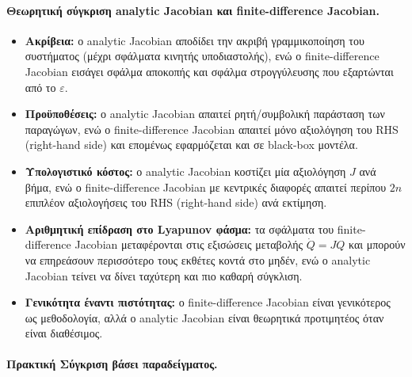 \documentclass[11pt,a4paper]{report}
\begin{document}
\paragraph{Θεωρητική σύγκριση analytic Jacobian και finite-difference Jacobian.}
\begin{itemize}
\item \textbf{Ακρίβεια:} ο analytic Jacobian αποδίδει την ακριβή γραμμικοποίηση του συστήματος (μέχρι σφάλματα κινητής υποδιαστολής), ενώ ο finite-difference Jacobian εισάγει σφάλμα αποκοπής και σφάλμα στρογγύλευσης που εξαρτώνται από το \(\varepsilon\).
\item \textbf{Προϋποθέσεις:} ο analytic Jacobian απαιτεί ρητή/συμβολική παράσταση των παραγώγων, ενώ ο finite-difference Jacobian απαιτεί μόνο αξιολόγηση του RHS (right-hand side) και επομένως εφαρμόζεται και σε black-box μοντέλα.
\item \textbf{Υπολογιστικό κόστος:} ο analytic Jacobian κοστίζει μία αξιολόγηση \(J\) ανά βήμα, ενώ ο finite-difference Jacobian με κεντρικές διαφορές απαιτεί περίπου \(2n\) επιπλέον αξιολογήσεις του RHS (right-hand side) ανά εκτίμηση.
\item \textbf{Αριθμητική επίδραση στο Lyapunov φάσμα:} τα σφάλματα του finite-difference Jacobian μεταφέρονται στις εξισώσεις μεταβολής \(\dot Q=JQ\) και μπορούν να επηρεάσουν περισσότερο τους εκθέτες κοντά στο μηδέν, ενώ ο analytic Jacobian τείνει να δίνει ταχύτερη και πιο καθαρή σύγκλιση.
\item \textbf{Γενικότητα έναντι πιστότητας:} ο finite-difference Jacobian είναι γενικότερος ως μεθοδολογία, αλλά ο analytic Jacobian είναι θεωρητικά προτιμητέος όταν είναι διαθέσιμος.
\end{itemize}

\paragraph{Πρακτική Σύγκριση βάσει παραδείγματος.}\leavevmode\\
\end{document}
